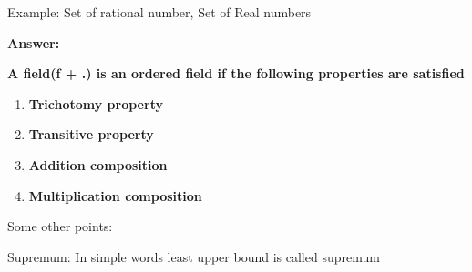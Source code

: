 \documentclass[12pt]{article}
\renewcommand{\_}{\kern-1.5pt\textunderscore\kern-1.5pt}
\begin{document}
\vspace{\baselineskip}
\begin{FlushLeft}
{\fontsize{10pt}{12.0pt}\selectfont Example: Set of rational number, Set of Real numbers\par}
\end{FlushLeft}\par


\vspace{\baselineskip}
\begin{FlushLeft}
{\fontsize{10pt}{12.0pt}\selectfont  \par}
\end{FlushLeft}\par


\vspace{\baselineskip}

\vspace{\baselineskip}
\begin{FlushLeft}
\textbf{Answer:}
\end{FlushLeft}\par

\begin{FlushLeft}
\textbf{A field(f + .) is an ordered field if the following properties are satisfied}
\end{FlushLeft}\par


\vspace{\baselineskip}
\begin{enumerate}
	\item \textbf{Trichotomy property}\par

	\item \textbf{Transitive property}\par

	\item \textbf{Addition composition}\par

	\item \textbf{Multiplication composition}
\end{enumerate}\par


\vspace{\baselineskip}
\begin{FlushLeft}
Some other points:
\end{FlushLeft}\par


\vspace{\baselineskip}
\begin{FlushLeft}
Supremum: In simple words least upper bound is called supremum
\end{FlushLeft}\par
\end{document}
